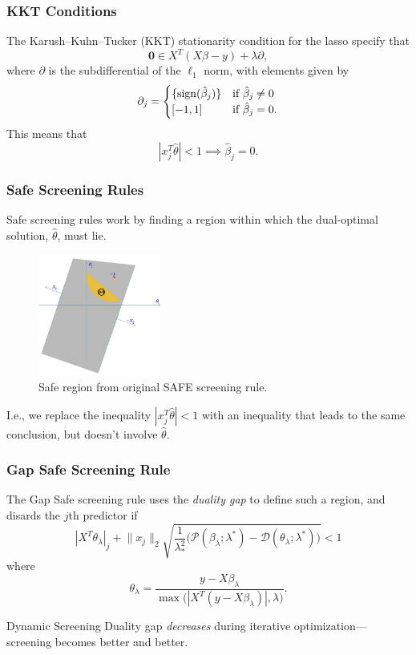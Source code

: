 \documentclass[10pt,ignorenonframetext]{beamer}
\begin{document}
\begin{frame}[c]
  \frametitle{KKT Conditions}
  The Karush--Kuhn--Tucker (KKT) stationarity condition for the lasso specify
  that
  \[
    \boldsymbol{0} \in X^T(X\beta - y) + \lambda\partial,
  \]
  where \(\partial\) is the subdifferential of the \(\ell_1\) norm, with
  elements given by
  \[
    \partial_j  =
    \begin{cases}
      \{\operatorname{sign}(\hat\beta_j)\} & \text{if }\hat\beta_j \neq 0 \\
      [-1,1]                 & \text{if } \hat\beta_j = 0.
    \end{cases}
  \]
  This means that \[
    |x_j^T \hat\theta| < 1 \implies \hat\beta_j = 0.
  \]
\end{frame}

\begin{frame}[c]
  \frametitle{Safe Screening Rules}
  Safe screening rules work by finding a region within which the dual-optimal
  solution, \(\hat\theta\), must lie.
  \medskip

  \begin{figure}[htpb]
    \centering
    \includegraphics[height=4cm]{images/safe-regions.png}
    \caption{Safe region from original SAFE screening rule.}%
    \label{fig:safe-regions}
  \end{figure}

  I.e., we replace the inequality \(|x_j^T \hat\theta| < 1\) with an inequality
  that leads to the same conclusion, but doesn't involve \(\hat\theta\).
\end{frame}

\begin{frame}[c]
  \frametitle{Gap Safe Screening Rule}
  The Gap Safe screening rule uses the \emph{duality gap} to define such a
  region, and disards the \(j\)th predictor if
  \begin{equation*}
    |X^T \theta_\lambda|_j + \lVert x_j\rVert_2
    \sqrt{
      \frac{1}{\lambda_*^2}
      \big(\mathcal{P}(\beta_\lambda; \lambda^*) -
      \mathcal{D}(\theta_\lambda; \lambda^*)\big)
    }
    < 1
  \end{equation*}
  where
  \[
    \theta_\lambda = \frac{y - X\beta_\lambda}{
      \max\big( |X^T(y - X\beta_\lambda)|, \lambda\big)}.
  \]
  \medskip

  \begin{block}{Dynamic Screening}
    Duality gap \emph{decreases} during iterative
    optimization---screening becomes better and better.
  \end{block}
\end{frame}
\end{document}
